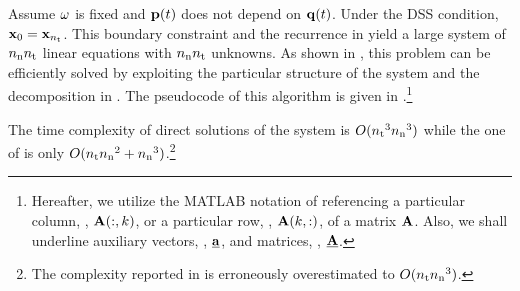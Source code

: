 Assume $\omega$ is fixed and $\mathbf{p}(t)$ does not depend on $\mathbf{q}(t)$.
Under the DSS condition, $\mathbf{x}_0 = \mathbf{x}_{n_\text{t}}$.
This boundary constraint and the recurrence in  yield a large system of ${n_\text{n}} {n_\text{t}}$ linear equations with ${n_\text{n}} {n_\text{t}}$ unknowns.
As shown in \cite{ukhov2012}, this problem can be efficiently solved by exploiting the particular structure of the system and the decomposition in .
The pseudocode of this algorithm is given in .\footnote{Hereafter, we utilize the MATLAB notation of referencing a particular column, \eg, $\mathbf{A}(:, k)$, or a particular row, \eg, $\mathbf{A}(k, :)$, of a matrix $\mathbf{A}$. Also, we shall underline auxiliary vectors, \eg, $\underline{\mathbf{a}}$, and matrices, \eg, $\underline{\mathbf{A}}$.}


The time complexity of direct solutions of the system is $O({n_\text{t}}^3 {n_\text{n}}^3)$ while the one of  is only $O({n_\text{t}} {n_\text{n}}^2 + {n_\text{n}}^3)$.\footnote{The complexity reported in \cite{ukhov2012} is erroneously overestimated to $O({n_\text{t}} {n_\text{n}}^3)$.}
